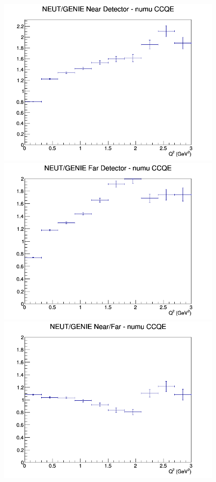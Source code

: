 \documentclass[12pt]{article}
\begin{document}
\begin{figure}[h]
\endminipage
\newline
{}
\includegraphics[width=\linewidth]{eff_Q2/FGT/ratios/CCQE_NEUT_GENIE_numu_near_Q2.png}
\endminipage
{}
\includegraphics[width=\linewidth]{eff_Q2/FGT/ratios/CCQE_NEUT_GENIE_numu_far_Q2.png}
\endminipage
{}
\includegraphics[width=\linewidth]{eff_Q2/FGT/ratios/CCQE_NEUT_GENIE_numu_NF_Q2.png}

\end{figure}
\end{document}
